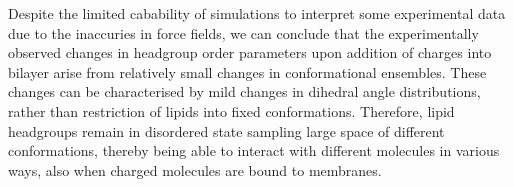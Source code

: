 \documentclass[aps,prl,superscriptaddress,twocolumn]{revtex4}
\begin{document}





Despite the limited cabability of simulations to interpret some experimental data due to
the inaccuries in force fields, we can conclude that the experimentally observed changes
in headgroup order parameters upon addition of charges into bilayer arise from relatively
small changes in conformational ensembles. These changes can be characterised by
mild changes in dihedral angle distributions, rather than restriction of lipids into
fixed conformations. Therefore, lipid headgroups remain in disordered state sampling large
space of different conformations, thereby being able to interact with different molecules
in various ways, also when charged molecules are bound to membranes.
\end{document}
